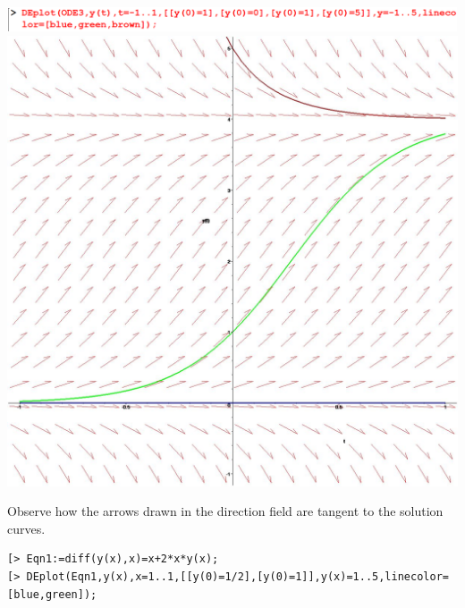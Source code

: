 \documentclass[
]{book}
\theoremstyle{definition}
\theoremstyle{definition}
\theoremstyle{definition}
\theoremstyle{definition}
\theoremstyle{remark}
\begin{document}
\includegraphics{figures/Diff/Diff 6.2 -13.png}
\includegraphics{figures/Diff/Diff 6.2 -13.jpg}

Observe how the arrows drawn in the direction field are tangent to the solution curves.

\begin{verbatim}
[> Eqn1:=diff(y(x),x)=x+2*x*y(x);
[> DEplot(Eqn1,y(x),x=1..1,[[y(0)=1/2],[y(0)=1]],y(x)=1..5,linecolor=[blue,green]);
\end{verbatim}
\end{document}
